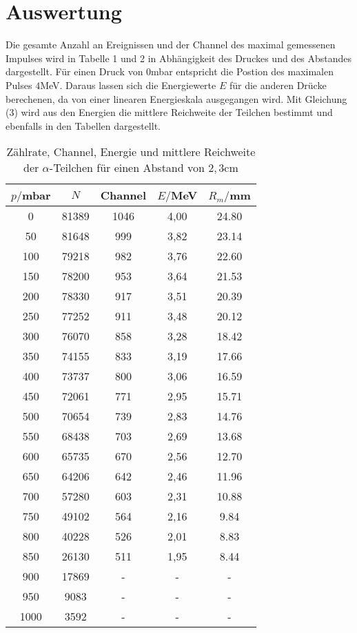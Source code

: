 \section{Auswertung}
\label{sec:Auswertung}

Die gesamte Anzahl an Ereignissen und der Channel des maximal gemessenen Impulses wird in Tabelle 1 und 2 in Abhängigkeit des Druckes und
des Abstandes dargestellt. Für einen Druck von $0$mbar entspricht die Postion des maximalen Pulses $4$MeV. Daraus lassen sich die Energiewerte $E$ für die
anderen Drücke berechenen, da von einer linearen Energieskala ausgegangen wird. Mit Gleichung (3) wird aus den Energien die mittlere Reichweite
der Teilchen bestimmt und ebenfalls in den Tabellen dargestellt.


\begin{table}[H]
  \centering
  \caption{Zählrate, Channel, Energie und mittlere Reichweite der $\alpha$-Teilchen für einen Abstand von $2,3$cm}
  \label{tab:Spannungsamplitude}
  \begin{tabular}{c c c c c}
    \toprule
    $p/$mbar & $N$ & Channel & $E/$MeV & $R_m/$mm \\
    \midrule
    0	  & 81389  &1046 &  4,00 & 24.80         \\
    50	 & 81648  & 999 &  3,82 & 23.14        \\
    100 & 79218  & 982 &  3,76 & 22.60        \\
    150 & 78200  & 953 &  3,64 & 21.53        \\
    200 & 78330  & 917 &  3,51 & 20.39        \\
    250 & 77252  & 911 &  3,48 & 20.12        \\
    300 & 76070  & 858 &  3,28 & 18.42        \\
    350 & 74155  & 833 &  3,19 & 17.66        \\
    400 & 73737  & 800 &  3,06 & 16.59        \\
    450 & 72061  & 771 &  2,95 & 15.71        \\
    500 & 70654  & 739 &  2,83 & 14.76        \\
    550 & 68438  & 703 &  2,69 & 13.68        \\
    600 & 65735  & 670 &  2,56 & 12.70        \\
    650 & 64206  & 642 &  2,46 & 11.96        \\
    700 & 57280  & 603 &  2,31 & 10.88        \\
    750 & 49102  & 564 &  2,16 & 9.84        \\
    800 & 40228  & 526 &  2,01 & 8.83        \\
    850 & 26130  & 511 &  1,95 & 8.44        \\
    900 & 17869  &  -  & -    & -        \\
    950 & 9083	 &  -  & -    & -        \\
    1000& 3592   &  -  & -    & -        \\
    \bottomrule
  \end{tabular}
\end{table}

